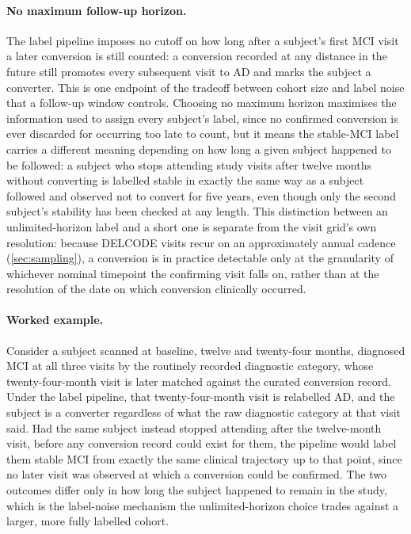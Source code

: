 \paragraph{No maximum follow-up horizon.} The label pipeline imposes no cutoff on how long
after a subject's first \ac{MCI} visit a later conversion is still counted: a conversion
recorded at any distance in the future still promotes every subsequent visit to \ac{AD} and
marks the subject a converter. This is one endpoint of the tradeoff between cohort size and
label noise that a follow-up window controls. Choosing no maximum horizon maximises the
information used to assign every subject's label, since no confirmed conversion is ever
discarded for occurring too late to count, but it means the stable-\ac{MCI} label carries a
different meaning depending on how long a given subject happened to be followed: a subject
who stops attending study visits after twelve months without converting is labelled stable
in exactly the same way as a subject followed and observed not to convert for five years,
even though only the second subject's stability has been checked at any length. This
distinction between an unlimited-horizon label and a short one is separate from the visit
grid's own resolution: because \ac{DELCODE} visits recur on an approximately annual cadence
(\autoref{sec:sampling}), a conversion is in practice detectable only at the granularity of
whichever nominal timepoint the confirming visit falls on, rather than at the resolution of
the date on which conversion clinically occurred.

\paragraph{Worked example.} Consider a subject scanned at baseline, twelve and twenty-four
months, diagnosed \ac{MCI} at all three visits by the routinely recorded diagnostic
category, whose twenty-four-month visit is later matched against the curated conversion
record. Under the label pipeline, that twenty-four-month visit is relabelled \ac{AD}, and
the subject is a converter regardless of what the raw diagnostic category at that visit
said. Had the same subject instead stopped attending after the twelve-month visit, before
any conversion record could exist for them, the pipeline would label them stable \ac{MCI}
from exactly the same clinical trajectory up to that point, since no later visit was
observed at which a conversion could be confirmed. The two outcomes differ only in how long
the subject happened to remain in the study, which is the label-noise mechanism the
unlimited-horizon choice trades against a larger, more fully labelled cohort.

